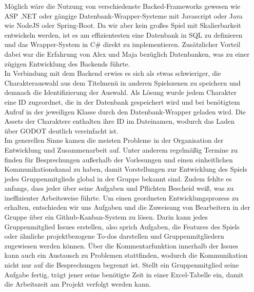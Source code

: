 Möglich wäre die Nutzung von verschiedenste Backed-Frameworks gewesen wie ASP .NET oder gängige 
Datenbank-Wrapper-Systeme mit Javascript oder Java wie NodeJS oder Spring-Boot.
Da wir aber kein großes Spiel mit Skalierbarkeit entwickeln werden, ist es am effizientesten eine Datenbank in SQL zu 
definieren und das Wrapper-System in C\# direkt zu implementieren. 
Zusätzlicher Vorteil dabei war die Erfahrung von Alex und Maja bezüglich Datenbanken, was zu einer zügigen Entwicklung
des Backends führte.\\
\newline
\newpage
In Verbindung mit dem Backend erwies es sich als etwas schwieriger, die Charakterauswahl aus dem Titelmenü in anderen
Spielszenen zu speichern und demnach die Identifizierung der Auswahl.
Als Lösung wurde jedem Charakter eine ID zugeordnet, die in der Datenbank gespeichert wird und bei benötigtem Aufruf
in der jeweiligen Klasse durch den Datenbank-Wrapper geladen wird.
Die Assets der Charaktere enthalten ihre ID im Dateinamen, wodurch das Laden über GODOT deutlich vereinfacht ist. \\
\newline
Im generellen Sinne kamen die meisten Probleme in der Organisation der Entwicklung und Zusammenarbeit auf. 
Unter anderem regelmäßig Termine zu finden für Besprechungen außerhalb der Vorlesungen und einen einheitlichen
Kommunikationskanal zu haben, damit Vorstellungen zur Entwicklung des Spiels jedes Gruppenmitglieds global in der Gruppe
bekannt sind.
Zudem fehlte es anfangs, dass jeder über seine Aufgaben und Pflichten Bescheid weiß, was zu ineffizienter Arbeitsweise 
führte.
Um einen geordneten Entwicklungsprozess zu erhalten, entschieden wir uns Aufgaben und die Zuweisung von Bearbeitern 
in der Gruppe über ein Github-Kanban-System zu lösen.
Darin kann jedes Gruppenmitglied Issues erstellen, also sprich Aufgaben, die Features des Spiels oder ähnliche 
projektbezogene To-dos darstellen und Gruppenmitgliedern zugewiesen werden können.
Über die Kommentarfunktion innerhalb der Issues kann auch ein Austausch zu Problemen stattfinden,
wodurch die Kommunikation nicht nur auf die Besprechungen begrenzt ist.
Stellt ein Gruppenmitglied seine Aufgabe fertig, trägt jener seine benötigte Zeit in einer Excel-Tabelle ein, damit
die Arbeitszeit am Projekt verfolgt werden kann.